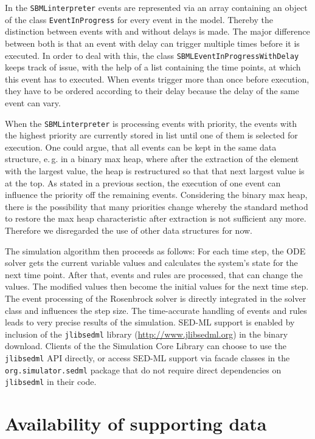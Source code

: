 \documentclass[10pt]{bmc_article}
\newenvironment{bmcformat}{\baselineskip20pt\sloppy\setboolean{publ}{false}}{\baselineskip20pt\sloppy}
\newcommand{\SBMLinterpreter}{\texttt{SBML\-interpreter}}
\newcommand{\jlibsedml}{\texttt{jlibsedml}}
\newcommand{\EventInProgress}{\texttt{Event\-In\-Progress}}
\newcommand{\SBMLEventInProgressWithDelay}{\texttt{SBML\-Event\-In\-Progress\-With\-Delay}}
\begin{document}
\begin{bmcformat}
In the \SBMLinterpreter{} events are represented via an array containing an object of the class \EventInProgress{} for every event in the model. Thereby the distinction between events with and without delays is made. The major difference between both is that an event with delay can trigger multiple times before it is executed. In order to deal with this, the class \SBMLEventInProgressWithDelay{} keeps track of issue, with the help of a list containing the time points, at which this event has to executed. When events trigger more than once before execution, they have to be ordered according to their delay because the delay of the same event can vary.

When the \SBMLinterpreter{} is processing events with priority, the events with the highest priority 
are currently stored in list until one of them is selected for execution. One could argue, that all events can
be kept in the same data structure, e.\,g. in a binary max heap, where after the extraction of the element with the largest value, the heap is restructured so that that next largest value is at the top. As stated
in a previous section, the execution of one event can influence the priority off the remaining events. Considering the binary max heap, there is the possibility that many priorities change whereby the standard
method to restore the max heap characteristic after extraction is not sufficient any more. Therefore we disregarded the use of other data structures for now.
%

The simulation algorithm then proceeds as follows: For each time step, the ODE
solver gets the current variable values and
calculates the system's state for the next time point. After that, events
and rules are processed, that can change the values. The modified values then
become the initial values for the next time step. The event processing of the
Rosenbrock solver
is directly integrated in the solver class and influences the
step size. The time-accurate handling of events and rules leads to very precise
results of the simulation.
%
SED-ML support is enabled by inclusion of the \jlibsedml{} library
(\href{http://www.jlibsedml.org}{http://www.jlibsedml.org}) in the binary
download. Clients of the the Simulation Core Library can choose to use the
\jlibsedml{} API directly, or access SED-ML support via  facade classes
in the \texttt{org.simulator.sedml} package that do not require direct
dependencies on \jlibsedml{} in their code.


\section{Availability of supporting data}


\end{bmcformat}
\end{document}
